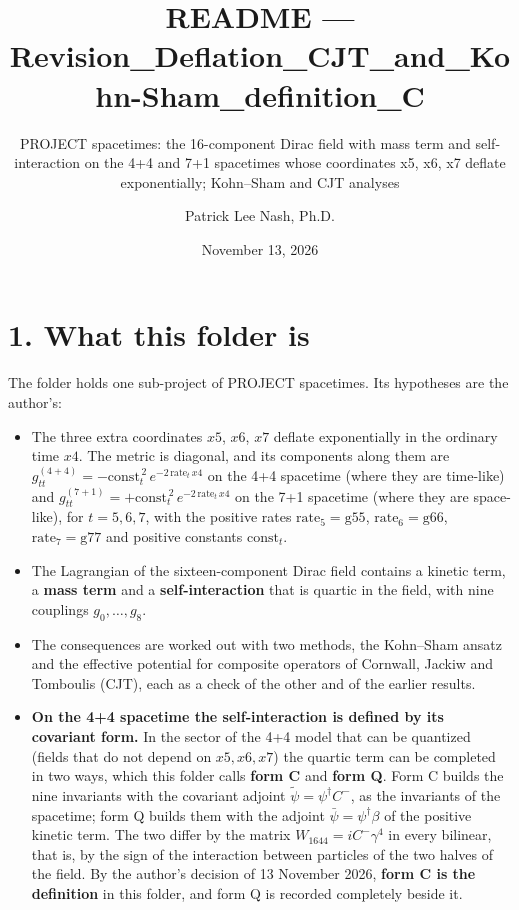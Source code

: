 \documentclass[
  10pt,
]{article}
\title{README ---
Revision\_Deflation\_CJT\_and\_Kohn-Sham\_definition\_C}
\subtitle{PROJECT spacetimes: the 16-component Dirac field with mass
term and self-interaction on the 4+4 and 7+1 spacetimes whose
coordinates x5, x6, x7 deflate exponentially; Kohn--Sham and CJT
analyses}
\author{Patrick Lee Nash, Ph.D.}
\date{November 13, 2026}
\providecommand{\tightlist}{%
  \setlength{\itemsep}{0pt}\setlength{\parskip}{0pt}}
\begin{document}
\maketitle

\hypertarget{what-this-folder-is}{%
\section{1. What this folder is}\label{what-this-folder-is}}

The folder holds one sub-project of PROJECT spacetimes. Its hypotheses
are the author's:

\begin{itemize}
\tightlist
\item
  The three extra coordinates \(x5\), \(x6\), \(x7\) deflate
  exponentially in the ordinary time \(x4\). The metric is diagonal, and
  its components along them are
  \(g^{(4+4)}_{tt}=-\mathrm{const}_t^{\,2}\,e^{-2\,\mathrm{rate}_t\,x4}\)
  on the 4+4 spacetime (where they are time-like) and
  \(g^{(7+1)}_{tt}=+\mathrm{const}_t^{\,2}\,e^{-2\,\mathrm{rate}_t\,x4}\)
  on the 7+1 spacetime (where they are space-like), for \(t=5,6,7\),
  with the positive rates \(\mathrm{rate}_5=\mathrm{g55}\),
  \(\mathrm{rate}_6=\mathrm{g66}\), \(\mathrm{rate}_7=\mathrm{g77}\) and
  positive constants \(\mathrm{const}_t\).
\item
  The Lagrangian of the sixteen-component Dirac field contains a kinetic
  term, a \textbf{mass term} and a \textbf{self-interaction} that is
  quartic in the field, with nine couplings \(g_0,\dots,g_8\).
\item
  The consequences are worked out with two methods, the Kohn--Sham
  ansatz and the effective potential for composite operators of
  Cornwall, Jackiw and Tomboulis (CJT), each as a check of the other and
  of the earlier results.
\item
  \textbf{On the 4+4 spacetime the self-interaction is defined by its
  covariant form.} In the sector of the 4+4 model that can be quantized
  (fields that do not depend on \(x5,x6,x7\)) the quartic term can be
  completed in two ways, which this folder calls \textbf{form C} and
  \textbf{form Q}. Form C builds the nine invariants with the covariant
  adjoint \(\tilde\psi=\psi^\dagger C^-\), as the invariants of the
  spacetime; form Q builds them with the adjoint
  \(\bar\psi=\psi^\dagger\beta\) of the positive kinetic term. The two
  differ by the matrix \(W_{1644}=iC^-\gamma^4\) in every bilinear, that
  is, by the sign of the interaction between particles of the two halves
  of the field. By the author's decision of 13 November 2026,
  \textbf{form C is the definition} in this folder, and form Q is
  recorded completely beside it.
\end{itemize}
\end{document}
